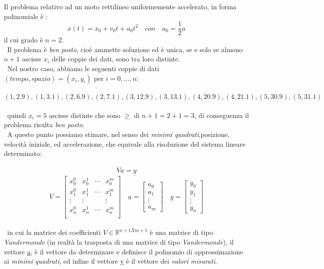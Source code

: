 Il problema relativo ad un moto rettilineo uniformemente accelerato, in forma polinomiale è :
	\[
		x(t) = x_0 + v_0t + a_0t^2 \quad con \quad a_0 = \frac{1}{2}a
	\]
il cui grado è $n=2$.\\\
Il problema è \textit{ben posto}, cioè ammette soluzione ed è unica, se e solo se almeno $n+1$ ascisse $x_i$ delle coppie dei dati, sono tra loro distinte.\\\
Nel nostro caso, abbiamo le seguenti coppie di dati $(tempo, spazio)=(x_i,y_i)$ per $i=0,...,n$:\\\
	\[
		(1,2.9),(1,3.1),(2,6.9),(2,7.1),(3,12.9),(3,13.1),(4,20.9),(4,21.1),(5,30.9),(5,31.1)	
	\]\\\
quindi $x_i=5$ ascisse distinte che sono $\geq$ di $n+1 = 2+1 = 3$, di conseguenza il problema risulta \textit{ben posto}.\\\
A questo punto possiamo stimare, nel senso dei \textit{minimi quadrati},posizione, velocità iniziale, ed accelerazione, che equivale alla risoluzione del sistema lineare determinato:\\\
	\[
		V\underline{a}=\underline{y}
	\]
	\[
		V=\begin{bmatrix}
			x_0^0 & x_0^1 & \cdots & x_0^m \\
			x_1^0 & x_1^1 & \cdots & x_1^m \\
			\vdots & \vdots & & \vdots \\
			x_n^0 & x_n^1 & \cdots & x_n^m \\		
		\end{bmatrix}
		\quad
		\underline{a}=\begin{bmatrix}
			a_0 \\
			a_1 \\
			\vdots \\
			a_m
		\end{bmatrix}
		\quad
		\underline{y}=\begin{bmatrix}
			y_0 \\
			y_1 \\
			\vdots \\
			y_n
		\end{bmatrix}
	\]\\\
in cui la matrice dei coefficienti $V \in \mathbb{R}^{n+1Xm+1}$ è una matrice di tipo \textit{Vandermonde} (in realtà la trasposta di una matrice di tipo \textit{Vandermonde}), il vettore \underline{a}, è il vettore  da determinare e definisce il polinomio di approssimazione ai \textit{minimi quadrati}, ed infine il vettore \underline{y} è il vettore dei \textit{valori misurati}.\\\
